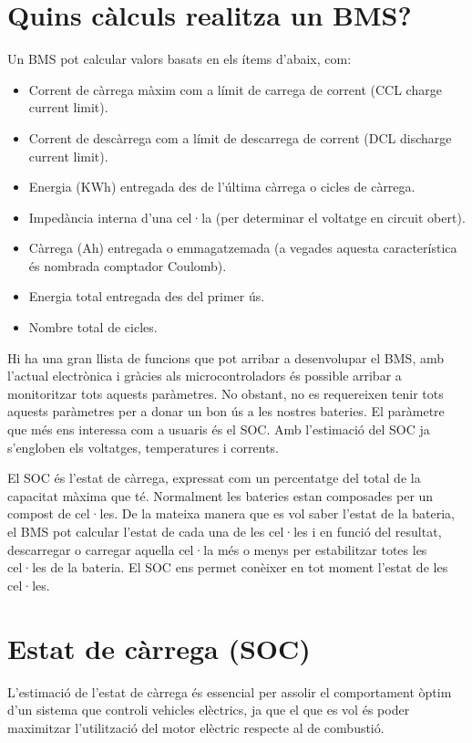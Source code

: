 \section{Quins càlculs realitza un BMS?}
Un BMS pot calcular valors basats en els ítems d’abaix, com:
\begin{itemize}
	\item Corrent de càrrega màxim com a límit de carrega de corrent (CCL charge current limit).
	\item Corrent de descàrrega com a límit de descarrega de corrent (DCL discharge current limit).
	\item Energia (KWh) entregada des de l’última càrrega o cicles de càrrega.
	\item Impedància interna d’una cel·la (per determinar el voltatge en circuit obert).
	\item Càrrega (Ah) entregada o emmagatzemada (a vegades aquesta característica és nombrada comptador Coulomb).
	\item Energia total entregada des del primer ús.
	\item Nombre total de cicles.
\end{itemize}

Hi ha una gran llista de funcions que pot arribar a desenvolupar el BMS, amb l'actual electrònica i gràcies als microcontroladors és possible arribar a monitoritzar tots aquests paràmetres. No obstant, no es requereixen tenir tots aquests paràmetres per a donar un bon ús a les nostres bateries. El paràmetre que més ens interessa com a usuaris és el SOC. Amb l'estimació del SOC ja s'engloben els voltatges, temperatures i corrents. 

El SOC és l'estat de càrrega, expressat com un percentatge del total de la capacitat màxima que té. Normalment les bateries estan composades per un compost de cel·les. De la mateixa manera que es vol saber l'estat de la bateria, el BMS pot calcular l'estat de cada una de les cel·les i en funció del resultat, descarregar o carregar aquella cel·la més o menys per estabilitzar totes les cel·les de la bateria. El SOC ens permet conèixer en tot moment l'estat de les cel·les.

\section{Estat de càrrega (SOC)}
L'estimació de l'estat de càrrega és essencial per assolir el comportament òptim d'un sistema que controli vehicles elèctrics, ja que el que es vol és poder maximitzar l'utilització del motor elèctric respecte al de combustió.

